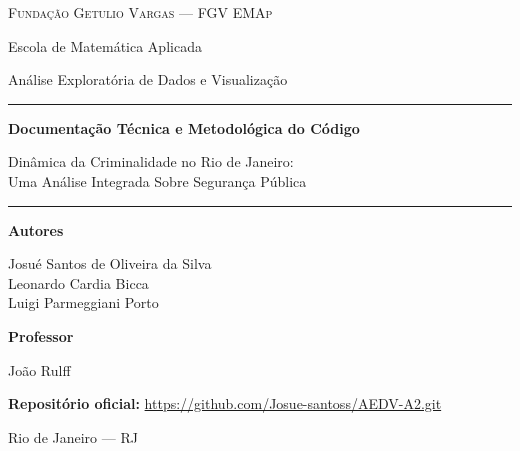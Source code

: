 \documentclass[11pt,a4paper]{article}
\begin{document}
\begin{titlepage}
  \centering
  \vspace*{1.2cm}

  {\scshape\large Fundação Getulio Vargas --- FGV EMAp\par}
  \vspace{0.25cm}
  {\normalsize Escola de Matemática Aplicada\par}
  \vspace{0.15cm}
  {\normalsize Análise Exploratória de Dados e Visualização \par}

  \vspace{3.0cm}

  \rule{\linewidth}{0.8pt}\par
  \vspace{0.6cm}
  {\LARGE\bfseries Documentação Técnica e Metodológica do Código\par}
  \vspace{0.45cm}
  {\large Dinâmica da Criminalidade no Rio de Janeiro:\\
  Uma Análise Integrada Sobre Segurança Pública\par}
  \vspace{0.6cm}
  \rule{\linewidth}{0.8pt}\par

  \vspace{2.6cm}

  {\normalsize\textbf{Autores}\par}
  \vspace{0.3cm}
  {\normalsize
    Josué Santos de Oliveira da Silva\\
    Leonardo Cardia Bicca\\
    Luigi Parmeggiani Porto\par
  }

  \vspace{1.2cm}

  {\normalsize\textbf{Professor}\par}
  \vspace{0.2cm}
  {\normalsize João Rulff\par}

  \vfill

  {\small\textbf{Repositório oficial:} \url{https://github.com/Josue-santoss/AEDV-A2.git}\par}
  \vspace{0.3cm}
  {\small Rio de Janeiro --- RJ\par}
\end{titlepage}
\end{document}
